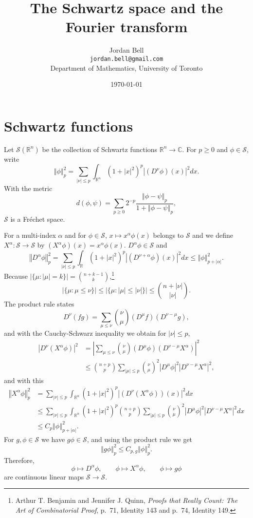 \documentclass{article}
\newcommand{\norm}[1]{\left\Vert #1 \right\Vert}
\theoremstyle{definition}
\begin{document}
\title{The Schwartz space and the Fourier transform}
\author{Jordan Bell\\ \texttt{jordan.bell@gmail.com}\\Department of Mathematics, University of Toronto}
\date{\today}

\maketitle

\section{Schwartz functions}
Let $\mathscr{S}(\mathbb{R}^n)$ be the collection of Schwartz functions $\mathbb{R}^n \to \mathbb{C}$.
For $p \geq 0$ and $\phi \in \mathscr{S}$, write
\[
\norm{\phi}_p^2 = \sum_{|\nu| \leq p} \int_{\mathbb{R}^n} (1+|x|^2)^p |(D^\nu \phi)(x)|^2 dx.
\]
With the metric
\[
d(\phi,\psi) = \sum_{p \geq 0} 2^{-p} \frac{\norm{\phi-\psi}_p}{1+\norm{\phi-\psi}_p},
\]
$\mathscr{S}$ is a Fr\'echet space. 

For a multi-index $\alpha$ and for $\phi \in \mathscr{S}$, 
$x \mapsto x^\alpha \phi(x)$ belongs to $\mathscr{S}$ and we define
$X^\alpha:\mathscr{S} \to \mathscr{S}$ by $(X^\alpha \phi)(x) = x^\alpha \phi(x)$. 
$D^\alpha \phi \in \mathscr{S}$ and
\[
\norm{D^\alpha \phi}_p^2 = \sum_{|\nu| \leq p} \int_{\mathbb{R}} (1+|x|^2)^p 
|(D^{\nu+\alpha} \phi)(x)|^2 dx
\leq \norm{\phi}_{p+|\alpha|}^2.
\]
Because $|\{\mu: |\mu| = k\}|=\binom{n+k-1}{k}$,\footnote{Arthur T. Benjamin and Jennifer J. Quinn,
{\em Proofs that Really Count: The Art of Combinatorial Proof}, p.~71, Identity 143 and p.~74, Identity 149.}
\[
|\{\mu: \mu \leq \nu\}| \leq |\{\mu: |\mu| \leq |\nu|\}| \leq \binom{n+|\nu|}{|\nu|}.
\]
The product rule states
\[
D^\nu (fg) = \sum_{\mu \leq \nu} \binom{\nu}{\mu} (D^\mu f) (D^{\nu-\mu}g),
\]
and with the Cauchy-Schwarz inequality we obtain for $|\nu| \leq p$,
\begin{align*}
|D^\nu (X^\alpha \phi)|^2&=\left| \sum_{\mu \leq \nu} \binom{\nu}{\mu}  (D^\mu \phi) 
(D^{\nu-\mu} X^\alpha) \right|^2\\
&\leq \binom{n+p}{p} \sum_{|\mu| \leq p} \binom{\nu}{\mu}^2 
 |D^\mu \phi|^2
|D^{\nu-\mu} X^\alpha|^2,
\end{align*}
and with this
\begin{align*}
\norm{X^\alpha \phi}_p^2& = \sum_{|\nu| \leq p} \int_{\mathbb{R}^n} (1+|x|^2)^p |(D^\nu (X^\alpha \phi))(x)|^2 dx\\
&\leq\sum_{|\nu| \leq p} \int_{\mathbb{R}^n} (1+|x|^2)^p 
\binom{n+p}{p} \sum_{|\mu| \leq p} \binom{\nu}{\mu}^2 
 |D^\mu \phi|^2
|D^{\nu-\mu} X^\alpha|^2 dx\\
&\leq C_p \norm{\phi}_{p+|\alpha|}^2.
\end{align*}
For $g,\phi \in \mathscr{S}$ we have $g \phi \in \mathscr{S}$, and using the product rule we get
\[
\norm{g \phi}_p^2 \leq C_{p,g} \norm{\phi}_p^2.
\]
Therefore, 
\[
\phi \mapsto D^\alpha \phi,\qquad \phi \mapsto X^\alpha \phi,\qquad \phi \mapsto g \phi
\]
are continuous linear maps $\mathscr{S} \to \mathscr{S}$.
\end{document}
